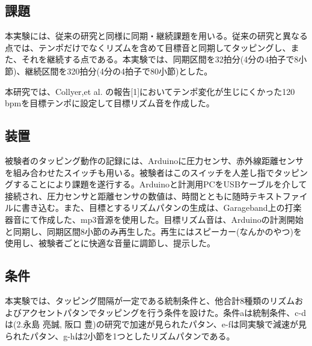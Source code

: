 \documentclass[twocolumn,10pt]{jarticle}
\begin{document}
\subsection{課題}
本実験には、従来の研究と同様に同期・継続課題を用いる。従来の研究と異なる点では、テンポだけでなくリズムを含めて目標音と同期してタッピングし、また、それを継続する点である。本実験では、同期区間を32拍分(4分の4拍子で8小節)、継続区間を320拍分(4分の4拍子で80小節)とした。

本研究では、Collyer,et al. の報告[1]においてテンポ変化が生じにくかった120 bpmを目標テンポに設定して目標リズム音を作成した。

\subsection{装置}
被験者のタッピング動作の記録には、Arduinoに圧力センサ、赤外線距離センサを組み合わせたスイッチも用いる。被験者はこのスイッチを人差し指でタッピングすることにより課題を遂行する。Arduinoと計測用PCをUSBケーブルを介して接続され、圧力センサと距離センサの数値は、時間とともに随時テキストファイルに書き込む。また、目標とするリズムパタンの生成は、Garageband上の打楽器音にて作成した、mp3音源を使用した。目標リズム音は、Arduinoの計測開始と同期し、同期区間8小節のみ再生した。再生にはスピーカー(なんかのやつ)を使用し、被験者ごとに快適な音量に調節し、提示した。

\subsection{条件}
本実験では、タッピング間隔が一定である統制条件と、他合計8種類のリズムおよびアクセントパタンでタッピングを行う条件を設けた。条件aは統制条件、c-dは(2.永島 亮誠, 阪口 豊)の研究で加速が見られたパタン、e-fは同実験で減速が見られたパタン、g-hは2小節を1つとしたリズムパタンである。
\end{document}
